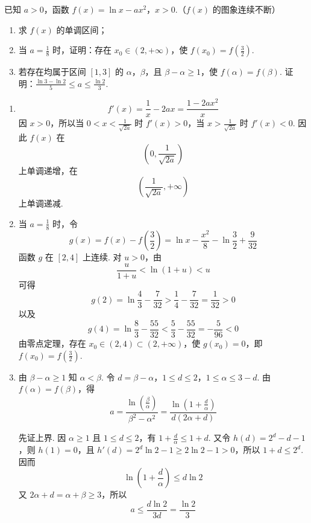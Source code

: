 \begin{problem}
已知 \(a > 0\)，函数 \(f(x) = \ln x - ax^2\)，\(x > 0\).（\(f(x)\) 的图象连续不断）
\begin{enumerate}
\item 求 \( f(x) \) 的单调区间；
\item 当 \(a = \frac{1}{8}\) 时，证明：存在 \(x_0 \in (2, +\infty)\)，使 \(f(x_0) = f\left(\frac{3}{2}\right)\).
\item 若存在均属于区间 \([1,3]\) 的 \(\alpha\)，\(\beta\)，且 \(\beta - \alpha \geqslant 1\)，使 \(f(\alpha) = f(\beta)\). 证明：\(\frac{\ln 3 - \ln 2}{5} \leqslant a \leqslant \frac{\ln 2}{3}\).
\end{enumerate}
\begin{solution}
\begin{enumerate}
\item
\[
f'(x)=\frac1x-2ax=\frac{1-2ax^2}{x}
\]
因 \(x>0\)，所以当 \(0<x<\frac{1}{\sqrt{2a}}\) 时 \(f'(x)>0\)，当
\(x>\frac{1}{\sqrt{2a}}\) 时 \(f'(x)<0\). 因此 \(f(x)\) 在
\[
\left(0,\frac1{\sqrt{2a}}\right)
\]
上单调递增，在
\[
\left(\frac1{\sqrt{2a}},+\infty\right)
\]
上单调递减.

\item 当 \(a=\frac{1}{8}\) 时，令
\[
g(x)=f(x)-f\left(\frac32\right)
=\ln x-\frac{x^2}{8}-\ln\frac32+\frac9{32}
\]
函数 \(g\) 在 \([2,4]\) 上连续. 对 \(u>0\)，由
\[
\frac{u}{1+u}<\ln(1+u)<u
\]
可得
\[
g(2)=\ln\frac43-\frac7{32}
>\frac14-\frac7{32}
=\frac1{32}>0
\]
以及
\[
g(4)=\ln\frac83-\frac{55}{32}
<\frac53-\frac{55}{32}
=-\frac5{96}<0
\]
由零点定理，存在 \(x_0\in(2,4)\subset(2,+\infty)\)，使
\(g(x_0)=0\)，即 \(f(x_0)=f\left(\frac32\right)\).

\item 由 \(\beta-\alpha\geqslant1\) 知 \(\alpha<\beta\). 令
\(d=\beta-\alpha\)，\(1\leqslant d\leqslant2\)，\(1\leqslant\alpha\leqslant3-d\).
由 \(f(\alpha)=f(\beta)\)，得
\[
a=\frac{\ln(\frac{\beta}{\alpha})}{\beta^2-\alpha^2}
=\frac{\ln(1+\frac{d}{\alpha})}{d(2\alpha+d)}
\]

先证上界. 因 \(\alpha\geqslant1\) 且 \(1\leqslant d\leqslant2\)，有
\(1+\frac{d}{\alpha}\leqslant1+d\). 又令 \(h(d)=2^d-d-1\)，则
\(h(1)=0\)，且 \(h'(d)=2^d\ln2-1\geqslant2\ln2-1>0\)，所以
\(1+d\leqslant2^d\). 因而
\[
\ln(1+\frac{d}{\alpha})\leqslant d\ln2
\]
又 \(2\alpha+d=\alpha+\beta\geqslant3\)，所以
\[
a\leqslant\frac{d\ln2}{3d}=\frac{\ln2}{3}
\]


\end{enumerate}
\end{solution}
\end{problem}
